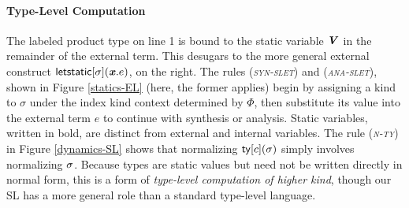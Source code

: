\documentclass[9pt,preprint]{sigplanconf}
\newcommand{\rulename}[1]{({\textsc{\textsl{#1}}})}
\begin{document}
\paragraph{Type-Level Computation}
The labeled product type on line 1 is bound to the static variable ${\textbf{\textit{V}}}$  in the remainder of the external term. This  desugars to the more general external construct ${\sf letstatic}[\sigma]({\textbf{\textit{x}}}.e)$, on the right. The rules \rulename{syn-slet} and \rulename{ana-slet}, shown in Figure \ref{statics-EL}  (here, the former applies) begin by assigning a kind to $\sigma$ under the index kind context determined by $\Phi$, then substitute its value into the external term $e$ to continue with synthesis or analysis. Static variables, written in bold, are distinct from external and internal variables. The rule \rulename{n-ty} in Figure \ref{dynamics-SL} shows that normalizing ${\sf ty}[c](\sigma)$ simply involves normalizing $\sigma$. Because types are static values but need not be written directly in normal form, this is  a form of \emph{type-level computation of higher kind}, though our SL has a more general role than a standard type-level language. %
\end{document}
